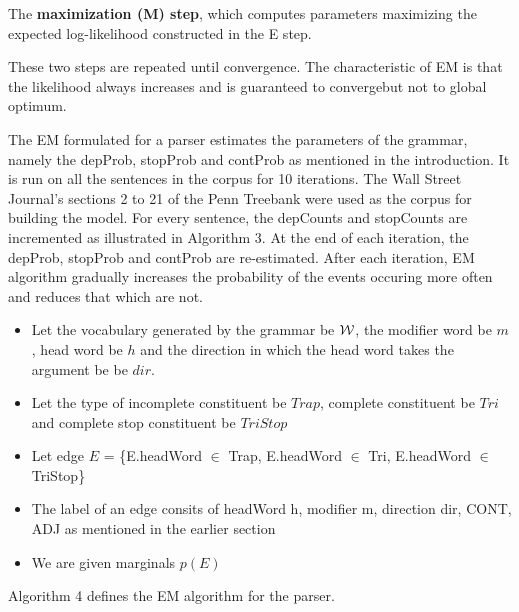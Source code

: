 \documentclass{book}
\begin{document}
The \textbf{maximization (M) step}, which computes parameters maximizing the expected log-likelihood constructed in the E step.

These two steps are repeated until convergence. The characteristic of EM is that the likelihood always increases and is guaranteed to convergebut not to global optimum.

The EM formulated for a parser estimates the parameters of the grammar, namely the depProb, stopProb and contProb as mentioned in the introduction. It is run on all the sentences in the corpus for 10 iterations. The Wall Street Journal's sections 2 to 21 of the Penn Treebank were used as the corpus for building the model. For every sentence, the depCounts and stopCounts are incremented as illustrated in Algorithm 3. At the end of each iteration, the depProb, stopProb and contProb are re-estimated. After each iteration, EM algorithm gradually increases the probability of the events occuring more often and reduces that which are not.

\begin{itemize}

\item Let the vocabulary generated by the grammar be ${\cal W}$, the modifier word be $m$, head word be $h$ and the direction in which the head word takes the argument be be $dir$.
\item Let the type of incomplete constituent be $Trap$, complete constituent be $Tri$ and complete stop constituent be $TriStop$
\item Let edge $E$ = \{E.headWord $\in$ Trap, E.headWord $\in$ Tri, E.headWord $\in$ TriStop\}
\item The label of an edge consits of headWord h, modifier m, direction dir, CONT, ADJ as mentioned in the earlier section
\item We are given marginals $p(E)$

\end{itemize}

Algorithm 4 defines the EM algorithm for the parser.
\end{document}
